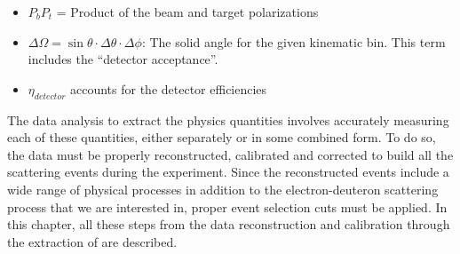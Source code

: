 \begin{itemize}
\begin{comment}    
  \item $N^{+/-}_{e^-}$: Number of incident electrons for +/- helicity states = $\left(\frac{ C_{Fcup}^{+/-}\cdot (10^{-9}/9264)}{Q_{e^-}} \right)\cdot \frac{C_{BPM}}{C_{Fcup}}$ with 
    \begin{itemize}
      \item $C_{Fcup}^{+/-}$: Helicity dependent Faraday-cup counts (live time gated)
      \item $\frac{10^9}{9264}$: Factor for converting Faraday cup counts into coulombs. (The factor 1/9264 converts the counts into nano-coulombs.)
      \item $Q_e = 1.0602\times 10^{-19}(C)$: the electron charge. %
      \item $\frac{C_{BPM}}{C_{Fcup}}$: the ratio of the Beam-Position-Monitor (BPM) and Faraday-cup counts. The BPM is located before the target so its count doesn't suffer the loss, but the Faraday-cup is located at the end of the beamline and because its physical radius is not large enough, parts of the beam's halo are not collected. Since, the size of the halo depends on the amount of material in the beamline as well as on the beam energy, the ratio is a function of the beam energy. For high beam energies such as 3 GeV, the ratio is close to 1 but for the lower beam energies it is lower than 1. For example the ratio is 0.965919 for 2.3 GeV\cite{HK_dXs_extr}. 
    \end{itemize}
\end{comment} 
   \item $P_bP_t$ = Product of the beam and target polarizations
   \item $\Delta\Omega=\sin\theta\cdot\Delta\theta\cdot\Delta\phi$: The solid angle for the given kinematic bin. %
   This term includes the ``detector acceptance''.
   \item $\eta_{detector}$ %
   accounts for the detector efficiencies
\end{itemize}

The data analysis to extract the physics quantities involves accurately measuring each of these quantities, either separately or in some combined form. To do so, the data must be properly reconstructed, calibrated and corrected to build all the scattering events during the experiment. Since the reconstructed events include a wide range of physical processes in addition to the electron-deuteron scattering process that we are interested in, proper event selection cuts must be applied. In this chapter, all these steps from the data reconstruction and calibration through the extraction of \gones are described.
